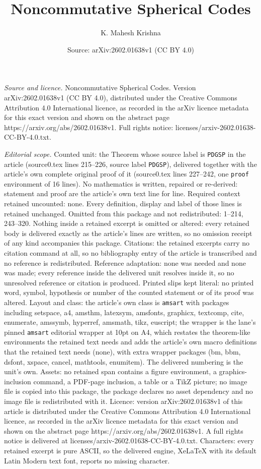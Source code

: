 \documentclass[10pt,a4paper]{amsart}
\title[Noncommutative Spherical Codes]{Noncommutative Spherical Codes}
\author{K. Mahesh Krishna}
\date{Source: arXiv:2602.01638v1 (CC BY 4.0)}
\begin{document}
\maketitle

\noindent\emph{Source and licence.} Noncommutative Spherical Codes. Version arXiv:2602.01638v1 (CC BY 4.0), distributed under the Creative Commons Attribution 4.0 International licence, as recorded in the arXiv licence metadata for this exact version and shown on the abstract page https://arxiv.org/abs/2602.01638v1. Full rights notice: licenses/arxiv-2602.01638-CC-BY-4.0.txt.\par\smallskip

\noindent\textit{Editorial scope.} Counted unit: the Theorem whose source label is \texttt{PDGSP} in the article (source0.tex lines 215--226, source label \texttt{PDGSP}), delivered together with the article's own complete original proof of it (source0.tex lines 227--242, one \texttt{proof} environment of 16 lines). No mathematics is written, repaired or re-derived: statement and proof are the article's own text line for line. Required context retained uncounted: none. Every definition, display and label of those lines is retained unchanged. Omitted from this package and not redistributed: 1--214, 243--320. Nothing inside a retained excerpt is omitted or altered: every retained body is delivered exactly as the article's lines are written, so no omission receipt of any kind accompanies this package. Citations: the retained excerpts carry no citation command at all, so no bibliography entry of the article is transcribed and no reference is redistributed. Reference adaptation: none was needed and none was made; every reference inside the delivered unit resolves inside it, so no unresolved reference or citation is produced. Printed slips kept literal: no printed word, symbol, hypothesis or number of the counted statement or of its proof was altered. Layout and class: the article's own class is \texttt{amsart} with packages including setspace, a4, amsthm, latexsym, amsfonts, graphicx, textcomp, cite, enumerate, amssymb, hyperref, amsmath, tikz, euscript; the wrapper is the lane's pinned \texttt{amsart} editorial wrapper at 10pt on A4, which restates the theorem-like environments the retained text needs and adds the article's own macro definitions that the retained text needs (none), with extra wrapper packages (bm, bbm, dsfont, xspace, cancel, mathtools, enumitem). The delivered numbering is the unit's own. Assets: no retained span contains a figure environment, a graphics-inclusion command, a PDF-page inclusion, a table or a TikZ picture; no image file is copied into this package, the package declares no asset dependency and no image file is redistributed with it. Licence: version arXiv:2602.01638v1 of this article is distributed under the Creative Commons Attribution 4.0 International licence, as recorded in the arXiv licence metadata for this exact version and shown on the abstract page https://arxiv.org/abs/2602.01638v1. A full rights notice is delivered at licenses/arxiv-2602.01638-CC-BY-4.0.txt. Characters: every retained excerpt is pure ASCII, so the delivered engine, XeLaTeX with its default Latin Modern text font, reports no missing character.
\end{document}
